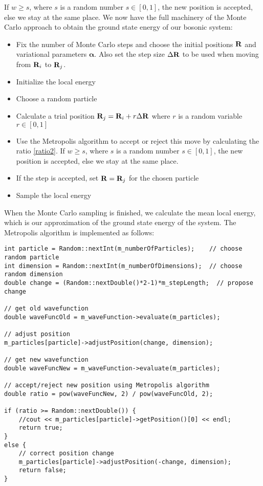 \documentclass[english, a4paper]{article}
\begin{document}
If $w \geq s$, where $s$ is a random number $s \in [0,1]$, the new position is accepted, else we stay
at the same place.
We now have the full machinery of the Monte Carlo approach to obtain the ground state energy of our bosonic system:
\begin{itemize}
 \item Fix the number of Monte Carlo steps and choose the initial positions ${\bf R}$
       and variational parameters $\boldsymbol{\alpha}$.
       Also set the step size $\Delta {\bf R}$ to be used when moving from ${\bf R}_i$ to ${\bf R}_j$.
 \item Initialize the local energy
 \item Choose a random particle
 \item Calculate a trial position ${\bf R}_j = {\bf R}_i + r  \Delta {\bf R}$ where $r$ is a random variable
       $r \in [0,1]$
 \item Use the Metropolis algorithm to accept or reject this move by calculating the ratio \eqref{ratio2}. 
       If $w \geq s$, where $s$ is a random number $s \in [0,1]$, the new position is accepted, else we stay
       at the same place.
 \item If the step is accepted, set ${\bf R} = {\bf R}_j$ for the chosen particle
 \item Sample the local energy
\end{itemize}
When the Monte Carlo sampling is finished, we calculate the mean local energy, which is our approximation
of the ground state energy of the system.
The Metropolis algorithm is implemented as follows:
\belowcaptionskip=-10pt
\begin{lstlisting}[label=MetropolisBrute,caption=Brute Force Metropolis algorithm]
int particle = Random::nextInt(m_numberOfParticles);    // choose random particle
int dimension = Random::nextInt(m_numberOfDimensions);  // choose random dimension
double change = (Random::nextDouble()*2-1)*m_stepLength;  // propose change

// get old wavefunction
double waveFuncOld = m_waveFunction->evaluate(m_particles);

// adjust position
m_particles[particle]->adjustPosition(change, dimension);

// get new wavefunction
double waveFuncNew = m_waveFunction->evaluate(m_particles);

// accept/reject new position using Metropolis algorithm
double ratio = pow(waveFuncNew, 2) / pow(waveFuncOld, 2);

if (ratio >= Random::nextDouble()) {
    //cout << m_particles[particle]->getPosition()[0] << endl;
    return true;
}
else {
    // correct position change
    m_particles[particle]->adjustPosition(-change, dimension);
    return false;
}
\end{lstlisting}
\end{document}
